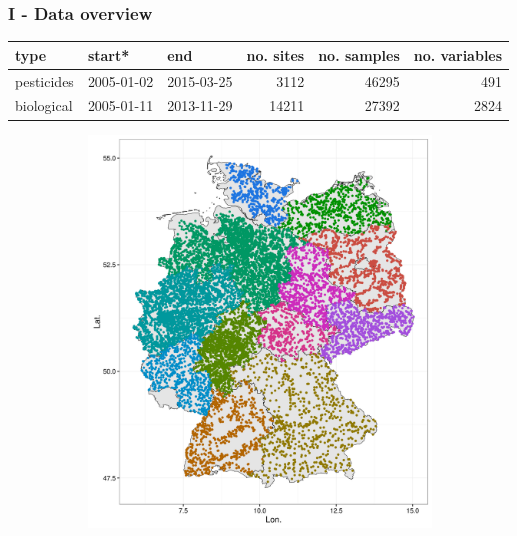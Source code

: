 \documentclass[12pt, t]{beamer}
\begin{document}
\begin{frame}
\frametitle{I - Data overview}
\begin{table}[htbp]
\scriptsize
\begin{tabular}{lllrrr}
type & start* & end & no. sites & no. samples & no. variables \\ \hline
pesticides & 2005-01-02 & 2015-03-25 & 3112 & 46295 & 491 \\ 
biological & 2005-01-11 & 2013-11-29 & 14211 & 27392 & 2824 \\ \hline
\end{tabular}
\end{table}

\begin{figure}
\centering
\begin{subfigure}{.5\textwidth}
  \centering
  \includegraphics[width=\linewidth]{fig/mzb_map.png}
\end{subfigure}%
\begin{subfigure}{.5\textwidth}
  \centering

\end{subfigure}
\end{figure}
\end{frame}
\end{document}
